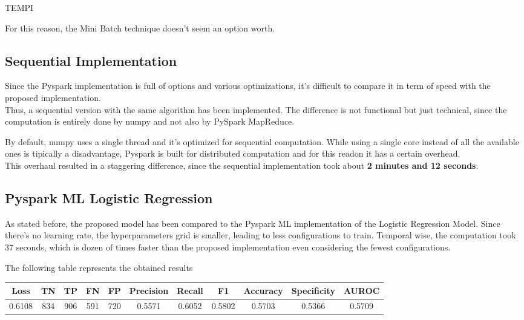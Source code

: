 \documentclass[
	letterpaper, %
	10pt, %
]{class}
\begin{document}
TEMPI

For this reason, the Mini Batch technique doesn't seem an option worth.

\subsection{Sequential Implementation}

Since the Pyspark implementation is full of options and various optimizations, it's difficult to compare it in term of speed with the proposed implementation.\\
Thus, a sequential version with the same algorithm has been implemented. The difference is not functional but just technical, since the computation is entirely done by numpy and not also by PySpark MapReduce.

By default, numpy uses a single thread and it's optimized for sequential computation. While using a single core instead of all the available ones is tipically a disadvantage, Pyspark is built for distributed computation and for this readon it has a certain overhead.\\
This overhaul resulted in a staggering difference, since the sequential implementation took about \textbf{2 minutes and 12 seconds}.

\subsection{Pyspark ML Logistic Regression}

As stated before, the proposed model has been compared to the Pyspark ML implementation of the Logistic Regression Model.
Since there's no learning rate, the hyperparameters grid is smaller, leading to less configurations to train.
Temporal wise, the computation took 37 seconds, which is dozen of times faster than the proposed implementation even considering the fewest configurations.

The following table represents the obtained results

\begin{center}
    \begin{tabular}{ |c|c|c|c|c|c|c|c|c|c|c| }
        \hline
        Loss   & TN  & TP  & FN  & FP  & Precision & Recall & F1     & Accuracy & Specificity & AUROC  \\
        \hline
        0.6108 & 834 & 906 & 591 & 720 & 0.5571    & 0.6052 & 0.5802 & 0.5703   & 0.5366      & 0.5709 \\
        \hline
    \end{tabular}
\end{center}
\end{document}
